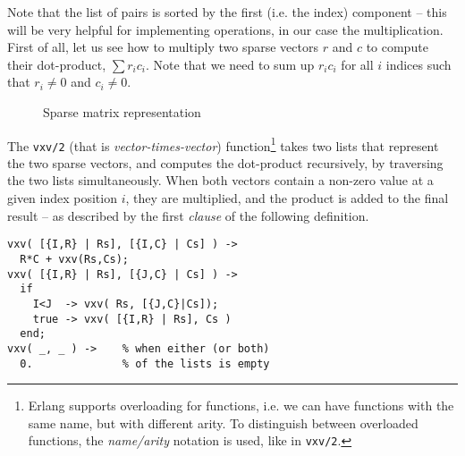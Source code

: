 Note that the list of pairs is sorted by the first (i.e. the index)
component --  this will be very
helpful for implementing operations, in our case the multiplication.
First of all, let us see how to multiply two sparse vectors $r$ and $c$
to compute their dot-product, $\sum r_i c_i$. Note that we need to sum
up $r_i c_i$ for all $i$ indices such that $r_i \neq 0$ and
$c_i \neq 0$.

\begin{figure*}[tbh]
\centering
\scalebox{0.8}{}
\caption{Sparse matrix representation}
\label{fig1}
\end{figure*}

The \lstinline[language=myerlang]{vxv/2} (that is \emph{vector-times-vector}) function\footnote{
Erlang supports overloading for functions, i.e. we can have functions with
the same name, but with different arity. To distinguish between overloaded
functions, the \emph{name/arity} notation is used, like in \lstinline[language=myerlang]{vxv/2}.
} takes
two lists that represent the two sparse vectors, and computes the
dot-product recursively, by traversing the two lists simultaneously.
When both vectors contain a non-zero value at a given index position
$i$, they are multiplied, and the product is added to the final result
-- as described by the first \emph{clause} of the following definition.

\begin{lstlisting}[language=myerlang]
vxv( [{I,R} | Rs], [{I,C} | Cs] ) ->
  R*C + vxv(Rs,Cs);
vxv( [{I,R} | Rs], [{J,C} | Cs] ) ->
  if
    I<J  -> vxv( Rs, [{J,C}|Cs]);
    true -> vxv( [{I,R} | Rs], Cs )
  end;
vxv( _, _ ) ->    % when either (or both)
  0.              % of the lists is empty

\end{lstlisting}



